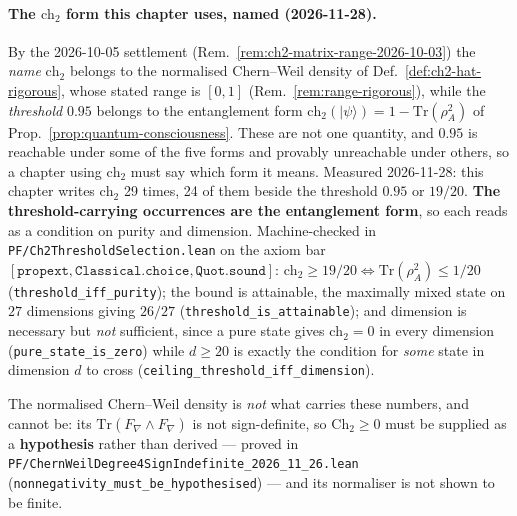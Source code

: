 %
\paragraph{The $\text{ch}_2$ form this chapter uses, named (2026-11-28).}
By the 2026-10-05 settlement (Rem.~\ref{rem:ch2-matrix-range-2026-10-03}) the
\emph{name} $\text{ch}_2$ belongs to the normalised Chern--Weil density of
Def.~\ref{def:ch2-hat-rigorous}, whose stated range is $[0,1]$
(Rem.~\ref{rem:range-rigorous}), while the \emph{threshold} $0.95$ belongs to the
entanglement form $\text{ch}_2(|\psi\rangle) = 1 - \mathrm{Tr}(\rho_A^2)$ of
Prop.~\ref{prop:quantum-consciousness}. These are not one quantity, and $0.95$ is
reachable under some of the five forms and provably unreachable under others, so a
chapter using $\text{ch}_2$ must say which form it means.
Measured 2026-11-28: this chapter writes $\text{ch}_2$ 29 times, 24 of them
beside the threshold $0.95$ or $19/20$. \textbf{The threshold-carrying occurrences
are the entanglement form}, so each reads as a condition on purity and dimension.
Machine-checked in \texttt{PF/Ch2ThresholdSelection.lean} on the axiom bar
$[\mathtt{propext}, \mathtt{Classical.choice}, \mathtt{Quot.sound}]$:
$\text{ch}_2 \geq 19/20 \iff \mathrm{Tr}(\rho_A^2) \leq 1/20$
(\texttt{threshold\_iff\_purity}); the bound is attainable, the maximally mixed
state on $27$ dimensions giving $26/27$ (\texttt{threshold\_is\_attainable}); and
dimension is necessary but \emph{not} sufficient, since a pure state gives
$\text{ch}_2 = 0$ in every dimension (\texttt{pure\_state\_is\_zero}) while
$d \geq 20$ is exactly the condition for \emph{some} state in dimension $d$ to
cross (\texttt{ceiling\_threshold\_iff\_dimension}).

\noindent The normalised Chern--Weil density is \emph{not} what carries these
numbers, and cannot be: its $\mathrm{Tr}(F_\nabla \wedge F_\nabla)$ is not
sign-definite, so $\mathrm{Ch}_2 \geq 0$ must be supplied as a \textbf{hypothesis}
rather than derived --- proved in
\texttt{PF/ChernWeilDegree4SignIndefinite\_2026\_11\_26.lean}
(\texttt{nonnegativity\_must\_be\_hypothesised}) --- and its normaliser is not
shown to be finite.


